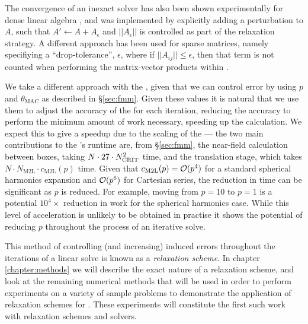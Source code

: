 The convergence of an inexact {\gmres} solver has also been shown experimentally for dense linear algebra \cite{vandeneshofsleijpen2004,bourasfraysse2005,simonciniszyld2003}, and was implemented by explicitly adding a perturbation to $A$, such that $A' \gets A + A_\epsilon$ and $||A_\epsilon||$ is controlled as part of the relaxation strategy. A different approach \cite{sidjewinkles2011} has been used for sparse matrices, namely specifiying a ``drop-tolerance'', $\epsilon$, where if $||A_{ij}|| \leq \epsilon$, then that term is not counted when performing the matrix-vector products within {\gmres}.

We take a different approach with the {\fmm}, given that we can control error by using $p$ and $\theta_{\text{MAC}}$ as described in \S\ref{sec:fmm}. Given these values it is natural that we use them to adjust the accuracy of the {\fmm} for each iteration, reducing the accuracy to perform the minimum amount of work necessary, speeding up the calculation. We expect this to give a speedup due to the scaling of the {\fmm} --- the two main contributions to the {\fmm}'s runtime are, from \S\ref{sec:fmm}, the near-field calculation between boxes, taking $N\cdot27\cdot N_{\text{CRIT}}^{2}$ time, and the {\mtol} translation stage, which takes $N\cdot N_{\text{M2L}}\cdot c_{\text{M2L}}(p)$ time. Given that $c_{\text{M2L}}(p) = \mathcal{O}(p^{4})$ for a standard spherical harmonics expansion and $\mathcal{O}(p^{6})$ for Cartesian series, the reduction in time can be significant as $p$ is reduced. For example, moving from $p = 10$ to $p=1$ is a potential $10^{4}\times$ reduction in work for the spherical harmonics case. While this level of acceleration is unlikely to be obtained in practise it shows the potential of reducing $p$ throughout the process of an iterative solve.


This method of controlling (and increasing) induced errors throughout the iterations of a linear solve is known as a \emph{relaxation scheme}. In chapter \ref{chapter:methods} we will describe the exact nature of a relaxation scheme, and look at the remaining numerical methods that will be used in order to perform experiments on a variety of sample {\bem} problems to demonstrate the application of relaxation schemes for {\fmmbem}. These experiments will constitute the first such work with relaxation schemes and {\fmmbem} solvers.

